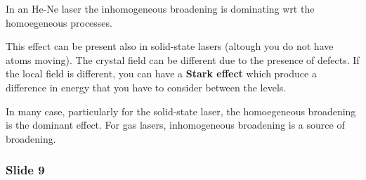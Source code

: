 \documentclass[../main/main.tex]{subfiles}
\begin{document}
In an He-Ne laser the inhomogeneous broadening is dominating wrt the homoegeneous processes.

This effect can be present also in solid-state lasers (altough you do not have atoms moving). The crystal field can be different due to the presence of defects. If the local field is different, you can have a \textbf{Stark effect} which produce a difference in energy that you have to consider between the levels.

In many case, particularly for the solid-state laser, the homoegeneous broadening is the dominant effect. For gas lasers, inhomogeneous broadening is a source of broadening.


\subsubsection*{Slide 9}
\end{document}
